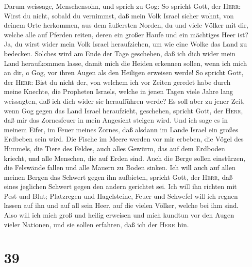 Darum weissage, Menschensohn, und sprich zu Gog: So spricht Gott, der
\textsc{Herr}: Wirst du nicht, sobald du vernimmst, daß mein Volk Israel
sicher wohnt,  von deinem Orte herkommen, aus dem
äußersten Norden, du und viele Völker mit dir, welche alle auf Pferden
reiten, deren ein großer Haufe und ein mächtiges Heer ist?
 Ja, du wirst wider mein Volk Israel heraufziehen, um wie
eine Wolke das Land zu bedecken. Solches wird am Ende der Tage
geschehen, daß ich dich wider mein Land heraufkommen lasse, damit mich
die Heiden erkennen sollen, wenn ich mich an dir, o Gog, vor ihren Augen
als den Heiligen erweisen werde!  So spricht Gott, der
\textsc{Herr}: Bist du nicht der, von welchem ich vor Zeiten geredet
habe durch meine Knechte, die Propheten Israels, welche in jenen Tagen
viele Jahre lang weissagten, daß ich dich wider sie heraufführen werde?
 Es soll aber zu jener Zeit, wenn Gog gegen das Land
Israel heraufzieht, geschehen, spricht Gott, der \textsc{Herr}, daß mir
das Zornesfeuer in mein Angesicht steigen wird.  Und ich
sage es in meinem Eifer, im Feuer meines Zornes, daß alsdann im Lande
Israel ein großes Erdbeben sein wird.  Die Fische im
Meere werden vor mir erbeben, die Vögel des Himmels, die Tiere des
Feldes, auch alles Gewürm, das auf dem Erdboden kriecht, und alle
Menschen, die auf Erden sind. Auch die Berge sollen einstürzen, die
Felswände fallen und alle Mauern zu Boden sinken.  Ich
will auch auf allen meinen Bergen das Schwert gegen ihn aufbieten,
spricht Gott, der \textsc{Herr}, daß eines jeglichen Schwert gegen den
andern gerichtet sei.  Ich will ihn richten mit Pest und
Blut; Platzregen und Hagelsteine, Feuer und Schwefel will ich regnen
lassen auf ihn und auf all sein Heer, auf die vielen Völker, welche bei
ihm sind.  Also will ich mich groß und heilig erweisen
und mich kundtun vor den Augen vieler Nationen, und sie sollen erfahren,
daß ich der \textsc{Herr} bin.

\hypertarget{section-38}{%
\section{39}\label{section-38}}

